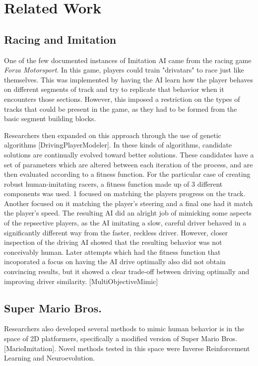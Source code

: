 \chapter{Related Work} %

\label{Chapter2} %

\section{Racing and Imitation}
One of the few documented instances of Imitation AI came from the racing game \textit{Forza Motorsport}. In this game, players could train "drivatars" to race just like themselves. This was implemented by having the AI learn how the player behaves on different segments of track and try to replicate that behavior when it encounters those sections. However, this imposed a restriction on the types of tracks that could be present in the game, as they had to be formed from the basic segment building blocks.

Researchers then expanded on this approach through the use of genetic algorithms [DrivingPlayerModeler]. In these kinds of algorithms, candidate solutions are continually evolved toward better solutions. These candidates have a set of parameters which are altered between each iteration of the process, and are then evaluated according to a fitness function. For the particular case of creating robust human-imitating racers, a fitness function made up of 3 different components was used. 1 focused on matching the players progress on the track. Another focused on it matching the player's steering and a final one had it match the player's speed. The resulting AI did an alright job of mimicking some aspects of the repsective players, as the AI imitating a slow, careful driver behaved in a significantly different way from the faster, reckless driver. However, closer inspection of the driving AI showed that the resulting behavior was not conceivably human. Later attempts which had the fitness function that incoporated a focus on having the AI drive optimally also did not obtain convincing results, but it showed a clear trade-off between driving optimally and improving driver similarity. [MultiObjectiveMimic]

\section{Super Mario Bros.}
Researchers also developed several methods to mimic human behavior is in the space of 2D platformers, specifically a modified version of Super Mario Bros. [MarioImitation]. Novel methods tested in this space were Inverse Reinforcement Learning and Neuroevolution. 

